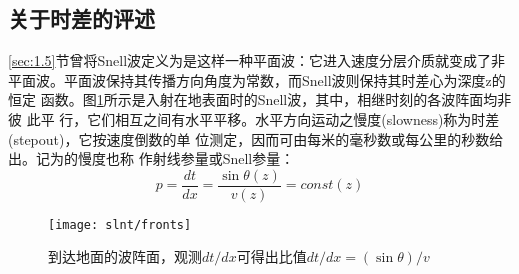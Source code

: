 \subsection{关于时差的评述}
\label{sec:5.0.3}

\ref{sec:1.5}节曾将Snell波定义为是这样一种平面波：它进入速度分层介质就变成了非
平面波。平面波保持其传播方向角度为常数，而Snell波则保持其时差心为深度z的恒定
函数。图\ref{fig:slnt/fronts}所示是入射在地表面时的Snell波，其中，相继时刻的各波阵面均非彼
此平
行，它们相互之间有水平平移。水平方向运动之慢度(slowness)称为时差(stepout)，它按速度倒数的单
位测定，因而可由每米的毫秒数或每公里的秒数给出。记为的慢度也称
作射线参量或Snell参量：
\begin{equation}
p=\frac{dt}{dx}=\frac{\sin\theta(z)}{v(z)}=const(z)
\label{eq:ex5.0.1}
\end{equation}

\begin{figure}[H]
\centering
\texttt{[image: slnt/fronts]}
\caption[fronts]{到达地面的波阵面，观测$dt/dx$可得出比值$dt/dx=(\sin\theta)/v$}
\label{fig:slnt/fronts}
\end{figure}
